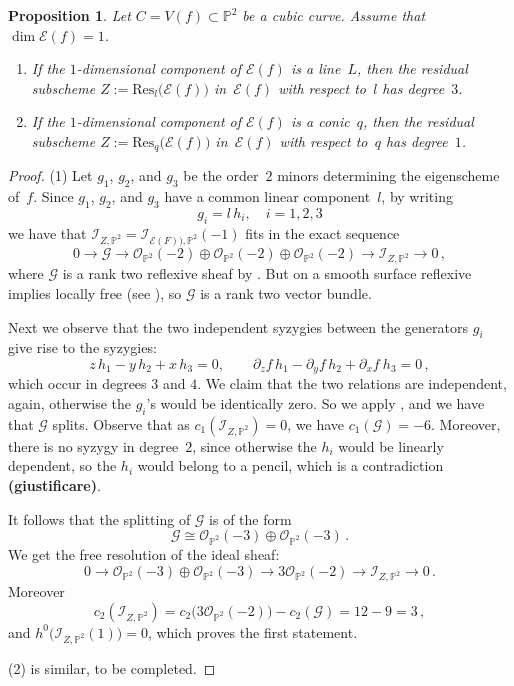 \documentclass{amsart}
\theoremstyle{plain}
\newtheorem{prop}[lemma]{Proposition}
\theoremstyle{definition}
\newcommand{\p}{\mathbb{P}}
\newcommand{\oo}{\mathcal{O}}
\newcommand{\Eig}[1]{\mathcal{E}\!\left( {#1} \right)}
\begin{document}
\begin{prop}
\label{p2}
Let $C = V(f) \subset \p^2$ be a cubic curve.
Assume that $\dim \Eig{f} = 1$.
%
\begin{enumerate}
  \item If the $1$-dimensional component of $\Eig{f}$ is a line~$L$,
  then the residual subscheme $Z := \mathrm{Res}_l \bigl( \Eig{f} \bigr)$ in~$\Eig{f}$ with respect to~$l$ has degree~$3$.
  \item If the $1$-dimensional component of $\Eig{f}$ is a conic~$q$,
  then the residual subscheme $Z := \mathrm{Res}_q \bigl( \Eig{f} \bigr)$ in~$\Eig{f}$ with respect to~$q$ has degree~$1$.
\end{enumerate}
%
\end{prop}
\begin{proof}
(1)
Let $g_1$, $g_2$, and $g_3$ be the order~$2$ minors determining the eigenscheme of~$f$.
Since $g_1$, $g_2$, and $g_3$ have a common linear component~$l$, by writing
\[
 g_i = l \, h_i, \quad i=1,2,3
\]
we have that $\mathcal{I}_{Z, \p^2} = \mathcal{I}_{\Eig{F}), \p^2} (-1)$
fits in the exact sequence
\[
 0 \to \mathcal{G} \to \oo_{\p^2} (-2) \oplus \oo_{\p^2} (-2) \oplus \oo_{\p^2} (-2) \to \mathcal{I}_{Z,\p^2} \to 0 \,,
\]
where $\mathcal{G}$ is a rank two reflexive sheaf by \cite[Proposition 1]{Hartshorne1980}.
But on a smooth surface reflexive implies locally free (see \cite[Example~1.1.6]{Huybrechts2010}),
so $\mathcal{G}$ is a rank two vector bundle.

Next we observe that the two independent
syzygies between the generators $g_i$ give rise to the syzygies:
\[
z\, h_1 - y\, h_2 + x\, h_3 = 0, \qquad \partial_z f\, h_1 - \partial_y f \, h_2 + \partial_x f \ h_3=0 \,,
\]
which occur in degrees $3$ and $4$. We claim that the two relations are independent, again,
otherwise the $g_i$'s would be identically zero. So we apply \cite[Proposition~12]{Ellia2020}, and we have that $\mathcal{G}$ splits. Observe that as $c_1(\mathcal{I}_{Z,\p^2})=0$, we have $c_1(\mathcal{G})=-6$. Moreover, there is no syzygy in degree~$2$, since
otherwise the $h_i$ would be linearly dependent, so the $h_i$ would belong to a pencil, which is a contradiction \textbf{(giustificare)}.

It follows that the splitting of $\mathcal{G}$ is of the form
%
\[
  \mathcal{G} \cong \oo_{\p^2} (-3) \oplus \oo_{\p^2} (-3) \,.
\]
%
We get the free resolution of the ideal sheaf:
%
\[
  0\to \oo_{\p^2} (-3)\oplus \oo_{\p^2} (-3) \to 3\oo_{\p^2} (-2)\to \mathcal{I}_{Z,\p^2} \to 0 \,.
\]
%
Moreover
%
\[
  c_2 (\mathcal{I}_{Z,\p^2} ) = c_2 \bigl( 3\oo_{\p^2}(-2) \bigr) - c_2 (\mathcal{G}) = 12 - 9 = 3 \,,
\]
%
and $h^0 \bigl( \mathcal{I}_{Z,\p^2}(1) \bigr) = 0$, which proves the first statement.

\medskip
(2) is similar, to be completed.
\end{proof}
\end{document}
